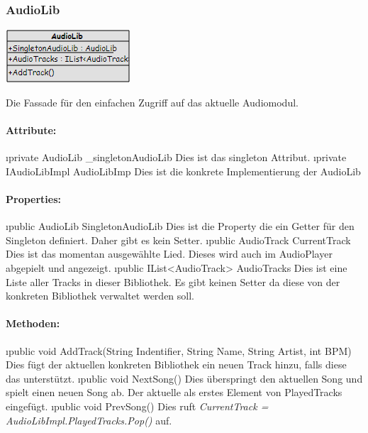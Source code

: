 \documentclass[../entwurf.tex]{subfiles}
\begin{document}
			\subsubsection{AudioLib}
				\begin{minipage}{0.45\textwidth}
					\includegraphics[width=\textwidth,height=\textheight,keepaspectratio]{../graphics/m_klassen/AudioLib.png}
				\end{minipage}
				\begin{minipage}{0.55\textwidth}
					Die Fassade für den einfachen Zugriff auf das aktuelle Audiomodul.
				\end{minipage}
				\paragraph{Attribute:}
					\begin{itemize}
						\i{private AudioLib \_singletonAudioLib} Dies ist das singleton Attribut.
						\i{private IAudioLibImpl AudioLibImp} Dies ist die konkrete Implementierung der
						AudioLib
					\end{itemize}
				\paragraph{Properties:}
					\begin{itemize}
						\i{public AudioLib SingletonAudioLib} Dies ist die Property die ein Getter für den
						Singleton definiert. Daher gibt es kein Setter.
						\i{public AudioTrack CurrentTrack} Dies ist das momentan ausgewählte Lied. Dieses
						wird auch im AudioPlayer abgepielt und angezeigt.
						\i{public IList<AudioTrack> AudioTracks} Dies ist eine Liste aller Tracks in dieser
						Bibliothek. Es gibt keinen Setter da diese von der konkreten Bibliothek verwaltet werden soll.
					\end{itemize}
				\paragraph{Methoden:}
					\begin{itemize}
						\i{public void AddTrack(String Indentifier, String Name, String Artist, int BPM)} 
						Dies fügt der aktuellen konkreten Bibliothek ein neuen Track hinzu,
						falls diese das unterstützt.
						\i{public void NextSong()} Dies überspringt den aktuellen Song und spielt einen neuen Song ab.
						Der aktuelle als erstes Element von PlayedTracks eingefügt.
						\i{public void PrevSong()} Dies ruft \textit{CurrentTrack = AudioLibImpl.PlayedTracks.Pop()} auf.
					\end{itemize}
\end{document}
